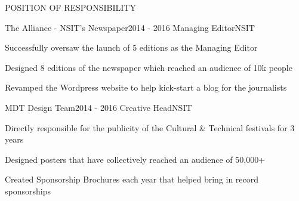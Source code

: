 \documentclass{resume} %
\begin{document}
\begin{rSection}{POSITION OF RESPONSIBILITY}

    \begin{rSubsection}{The Alliance - NSIT's Newspaper}{2014 - 2016}
        {Managing Editor}{NSIT}
        
        \item Successfully oversaw the launch of 5 editions as the Managing Editor
        \item Designed 8 editions of the newspaper which reached an audience of 10k people
        \item Revamped the Wordpress website to help kick-start a blog for the journalists
    \end{rSubsection}


    \begin{rSubsection}{MDT Design Team}{2014 - 2016}
        {Creative Head}{NSIT}
        
        \item Directly responsible for the publicity of the Cultural \& Technical festivals for 3 years
        \item Designed posters that have collectively reached an audience of 50,000+
        \item Created Sponsorship Brochures each year that helped bring in record sponsorships
    \end{rSubsection}

\end{rSection}

\end{document}
